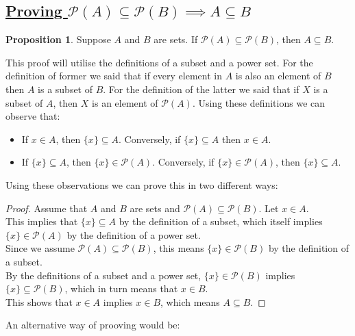 \documentclass{amsart} %
\theoremstyle{definition} %
\theoremstyle{definition}
\newtheorem*{prpn}{Proposition}
\theoremstyle{remark} %
\begin{document}
\bigskip \bigskip

\subsection{\underline{Proving $ \mathcal{P}(A) \subseteq \mathcal{P}(B) \implies A \subseteq B$}}

\begin{prpn}
      Suppose $A$ and $B$ are sets. If $\mathcal{P}(A) \subseteq \mathcal{P}(B)$, then $A \subseteq B$.
\end{prpn}

This proof will utilise the definitions of a subset and a power set. For the definition of former we said that if every element in $A$ is also an element of $B$ then $A$ is a subset of $B$. For the definition of the latter we said that if $X$ is a subset of $A$, then $X$ is an element of $\mathcal{P}(A)$. Using these definitions we can observe that:
\begin{itemize}
      \item If $x \in A$, then $\{x\} \subseteq A$. Conversely, if $\{x\} \subseteq A$ then $x \in A$.
      \item If $\{x\} \subseteq A$, then $\{x\} \in \mathcal{P}(A)$. Conversely, if $\{x\} \in \mathcal{P}(A)$, then $\{x\} \subseteq A$.
\end{itemize}

Using these observations we can prove this in two different ways:

\begin{proof}
      \indent Assume that $A$ and $B$ are sets and $\mathcal{P}(A) \subseteq \mathcal{P}(B)$. Let $x \in A$. \\
      \indent This implies that $\{x\} \subseteq A$ by the definition of a subset, which itself implies $\{x\} \in \mathcal{P}(A)$ by the definition of a power set. \\
      \indent Since we assume $\mathcal{P}(A) \subseteq \mathcal{P}(B)$, this means $\{x\} \in \mathcal{P}(B)$ by the definition of a subset. \\
      \indent By the definitions of a subset and a power set, $\{x\} \in \mathcal{P}(B)$ implies $\{x\} \subseteq \mathcal{P}(B)$, which in turn means that $x \in B$. \\
      \indent This shows that $x \in A$ implies $x \in B$, which means $A \subseteq B$.
\end{proof}

\noindent An alternative way of prooving would be:
\end{document}
